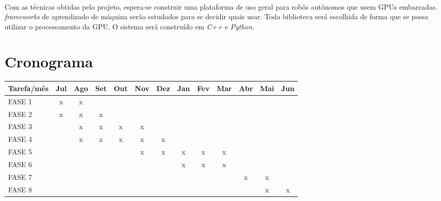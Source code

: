 \documentclass[11pt]{article}
\newcommand{\tit}[1]{\textit{#1}}
\begin{document}
\paragraph{}
Com as técnicas obtidas pelo projeto, espera-se construir uma plataforma
de uso geral para robôs autônomos que usem GPUs embarcadas.
\tit{frameworks} de aprendizado de máquina serão estudados para se decidir
quais usar. 
Toda biblioteca será escolhida de forma que se possa utilizar o processamento
da GPU. O sistema será construído em \tit{C++} e \tit{Python}.

\section{Cronograma}
\paragraph{}
\begin{table}[H]
\centering
\setlength{\tabcolsep}{.16667em}
\begin{tabular}{|C{3cm}|c|c|c|c|c|c|c|c|c|c|c|c|}
	\hline
	Tarefa/mês & Jul & Ago & Set & Out & Nov & Dez & Jan & Fev & Mar & Abr 
		& Mai & Jun \\
	\hline
	FASE 1 & x & x & & & & & & & & & &\\
	\hline
	FASE 2 & x & x & x & & & & & & & & & \\
	\hline
	FASE 3 & & x & x & x & x & & & & & & &  \\
	\hline
	FASE 4 & & x & x & x & x & x & & & & & &  \\
	\hline
	FASE 5 & & & & & x & x & x & x & x & & & \\
	\hline
	FASE 6 & & & & & & & x & x & x & & & \\
	\hline
	FASE 7 & & & & & & & & & & x & x & \\
	\hline
	FASE 8 & & & & & & & & & & & x & x \\
	\hline
\end{tabular}
\end{table}

\printbibliography
\end{document}
